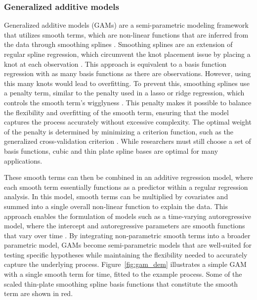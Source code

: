 \documentclass[man, floatsintext]{apa7}
\begin{document}
\subsubsection{Generalized additive models}

Generalized additive models (GAMs) are a semi-parametric modeling framework
that utilizes smooth terms, which are non-linear functions
that are inferred from the data through
smoothing splines \parencite{wood_generalized_2006, wood_inference_2020,
  hastie_generalized_1999}. Smoothing splines are an extension of regular
spline
regression, which circumvent the knot placement issue by placing a knot at each
observation \parencite{tsay_nonlinear_2019}. This approach is equivalent to a
basis function regression with as many basis functions as there are
observations. However, using this many knots would lead to overfitting. To
prevent this, smoothing splines use a penalty term, similar to the penalty
used in a lasso or ridge regression, which controls the smooth term's
wigglyness
\parencite{gu_smoothing_2013, wahba_spline_1980}. This penalty makes it
possible to balance the flexibility and overfitting of the smooth term,
ensuring that the model captures the process
accurately without excessive complexity. The optimal weight of the
penalty is
determined by minimizing a criterion function, such as the generalized
cross-validation criterion \parencite{wood_generalized_2006,
  golub_generalized_1997}. While researchers must still choose a set of basis
functions, cubic \parencite{tsay_nonlinear_2019} and thin plate spline bases
\parencite{wood_thin_2003} are optimal for many applications.

These smooth terms can then be combined in an additive regression model, where
each smooth term essentially functions as a predictor within a regular
regression
analysis. In this model, smooth terms can be multiplied by covariates and
summed into a single overall non-linear function to explain the data. This
approach enables the formulation of models such as a time-varying
autoregressive model, where the intercept and autoregressive parameters are
smooth functions that vary over time \parencite{bringmann_changing_2017,
  bringmann_modeling_2015}. By integrating non-parametric smooth terms into a
broader parametric model, GAMs become semi-parametric models that are
well-suited for testing specific hypotheses while maintaining the flexibility
needed to accurately capture the underlying process. Figure~\ref{fig:gam_dem}
illustrates a simple GAM with a single smooth term for time, fitted to the
example process. Some of the scaled thin-plate smoothing spline basis
functions that constitute the smooth term are shown in red.
\end{document}
